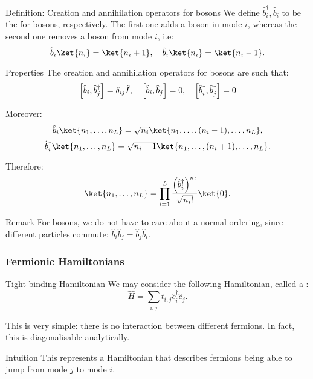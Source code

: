 \documentclass[a4paper]{article}
\begin{document}
\begin{parag}{Definition: Creation and annihilation operators for bosons}
    We define $\hat{b}_i^{\dagger}, \hat{b}_i$ to be the  for bosons, respectively. The first one adds a boson in mode $i$, whereas the second one removes a boson from mode $i$, i.e: 
    \[\hat{b}_i \ket{n_i} = \ket{n_i + 1}, \mathspace \hat{b}_i \ket{n_i} = \ket{n_i - 1}.\]
\end{parag}

\begin{parag}{Properties}
    The creation and annihilation operators for bosons are such that: 
    \[\left[\hat{b}_i, \hat{b}_j^{\dagger}\right] = \delta_{ij} \hat{I}, \mathspace \left[\hat{b}_i, \hat{b}_j\right] = 0, \mathspace \left[\hat{b}_i^{\dagger}, \hat{b}_j^{\dagger}\right] = 0\]

    Moreover: 
    \[\hat{b}_i \ket{n_1, \ldots, n_L} = \sqrt{n_i} \ket{n_1, \ldots, \left(n_i-1\right), \ldots, n_L},\]
    \[\hat{b}_i^{\dagger} \ket{n_1, \ldots, n_L} = \sqrt{n_i + 1} \ket{n_1, \ldots, \left(n_i+1\right), \ldots, n_L}.\]
    
    Therefore: 
    \[\ket{n_1, \ldots, n_L} = \prod_{i=1}^{L} \frac{\left(\hat{b}_i^{\dagger}\right)^{n_i}}{\sqrt{n_i!}} \ket{0}.\]

    \begin{subparag}{Remark}
        For bosons, we do not have to care about a normal ordering, since different particles commute: $\hat{b}_i \hat{b}_j = \hat{b}_j \hat{b}_i$.
    \end{subparag}
\end{parag}

\subsubsection{Fermionic Hamiltonians}

\begin{parag}{Tight-binding Hamiltonian}
    We may consider the following Hamiltonian, called a : 
    \[\hat{H} = \sum_{i, j} t_{i, j} \hat{c}_i^{\dagger} \hat{c}_j.\]

    This is very simple: there is no interaction between different fermions. In fact, this is diagonalisable analytically.

    \begin{subparag}{Intuition}
        This represents a Hamiltonian that describes fermions being able to jump from mode $j$ to mode $i$.
    \end{subparag}
\end{parag}
\end{document}
